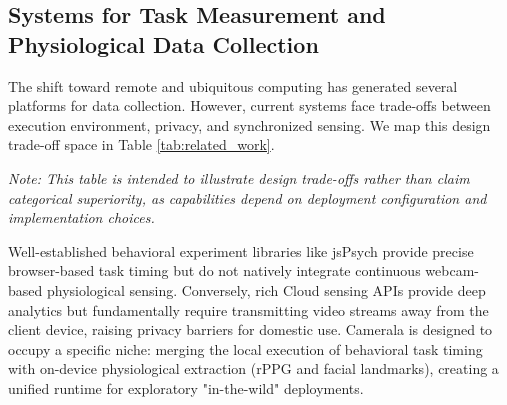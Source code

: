 \documentclass[final,3p,times,twocolumn]{elsarticle}
\begin{document}
\subsection{Systems for Task Measurement and Physiological Data Collection}
The shift toward remote and ubiquitous computing has generated several platforms for data collection. However, current systems face trade-offs between execution environment, privacy, and synchronized sensing. We map this design trade-off space in Table \ref{tab:related_work}.

\begin{table}[t]
\centering
\caption{Design Trade-off Mapping of Data Collection Platforms}
\label{tab:related_work}
\vspace{1mm}
\footnotesize{\textit{Note: This table is intended to illustrate design trade-offs rather than claim categorical superiority, as capabilities depend on deployment configuration and implementation choices.}}
\end{table}

Well-established behavioral experiment libraries like jsPsych provide precise browser-based task timing but do not natively integrate continuous webcam-based physiological sensing. Conversely, rich Cloud sensing APIs provide deep analytics but fundamentally require transmitting video streams away from the client device, raising privacy barriers for domestic use. Camerala is designed to occupy a specific niche: merging the local execution of behavioral task timing with on-device physiological extraction (rPPG and facial landmarks), creating a unified runtime for exploratory "in-the-wild" deployments.
\end{document}
